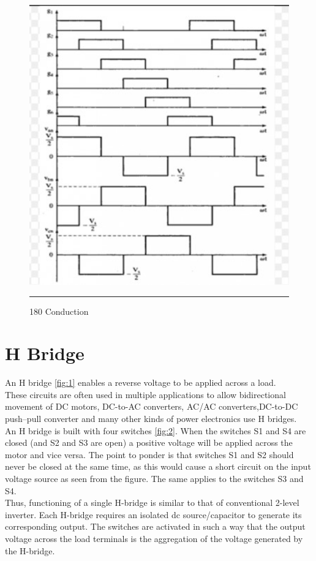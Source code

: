 \begin{figure}[htbp]
	\centering
		\includegraphics[width = 5in]{./Figures/Picture3.jpg}
		\rule{35em}{5pt}
	\caption{180 Conduction}
	\label{fig:4}
\end{figure}
 
\section{H Bridge}An H bridge \ref{fig:1} enables a reverse voltage to be applied across a load.\\
These circuits are often used in multiple applications to allow bidirectional movement of DC motors,
DC-to-AC converters, AC/AC converters,DC-to-DC push–pull converter and many other kinds of power electronics use H bridges.\\
 An H bridge is built with four switches \ref{fig:2}. When the switches S1 and S4 are closed (and S2 and S3 are open) a positive voltage will be applied across the motor and vice versa. The point to ponder is that switches S1 and S2 should never be closed at the same time, as this would cause a short circuit on the input voltage source as seen from the figure. The same applies to the switches S3 and S4.\\
 Thus, functioning of a single H-bridge is similar to that of
conventional 2-level inverter. Each H-bridge requires an
isolated dc source/capacitor to generate its corresponding
output. The switches are activated in such a way that the
output voltage across the load terminals is the aggregation
of the voltage generated by the H-bridge.
 
